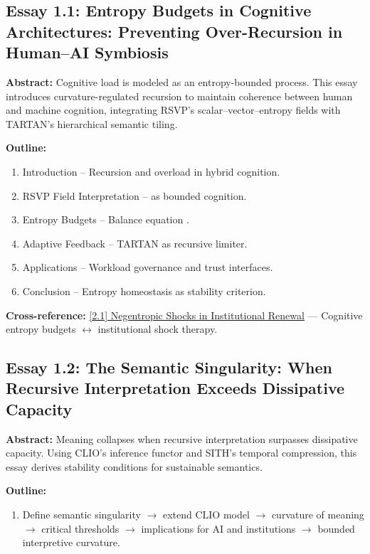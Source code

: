 \documentclass[12pt,a4paper]{article}
\begin{document}
\subsection{Essay 1.1: Entropy Budgets in Cognitive Architectures: Preventing Over-Recursion in Human--AI Symbiosis}
\label{sec:essay1-1}

\textbf{Abstract:} Cognitive load is modeled as an entropy-bounded process. This essay introduces curvature-regulated recursion to maintain coherence between human and machine cognition, integrating RSVP’s scalar--vector--entropy fields with TARTAN’s hierarchical semantic tiling.

\textbf{Outline:}
\begin{enumerate}
\item Introduction -- Recursion and overload in hybrid cognition.
\item RSVP Field Interpretation --  as bounded cognition.
\item Entropy Budgets -- Balance equation .
\item Adaptive Feedback -- TARTAN as recursive limiter.
\item Applications -- Workload governance and trust interfaces.
\item Conclusion -- Entropy homeostasis as stability criterion.
\end{enumerate}

\textbf{Cross-reference:} \hyperref[sec:essay2-1]{[2.1] Negentropic Shocks in Institutional Renewal} --- Cognitive entropy budgets $\leftrightarrow$ institutional shock therapy.

\subsection{Essay 1.2: The Semantic Singularity: When Recursive Interpretation Exceeds Dissipative Capacity}
\label{sec:essay1-2}

\textbf{Abstract:} Meaning collapses when recursive interpretation surpasses dissipative capacity. Using CLIO’s inference functor and SITH’s temporal compression, this essay derives stability conditions for sustainable semantics.

\textbf{Outline:}
\begin{enumerate}
\item Define semantic singularity $\to$ extend CLIO model $\to$ curvature of meaning  $\to$ critical thresholds $\to$ implications for AI and institutions $\to$ bounded interpretive curvature.
\end{enumerate}
\end{document}

